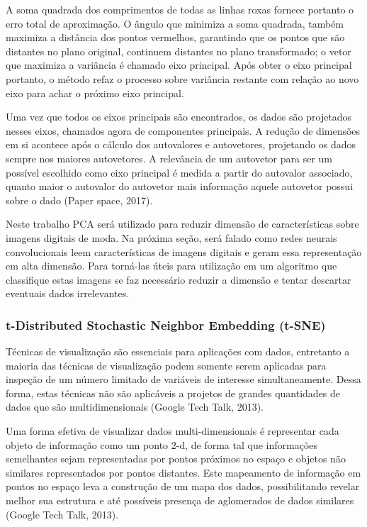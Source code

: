 \documentclass[12pt]{report}
\begin{document}
A soma quadrada dos comprimentos de todas as linhas roxas fornece portanto o erro total de aproximação. O ângulo que minimiza a soma quadrada, também maximiza a distância dos pontos vermelhos, garantindo que os pontos que são distantes no plano original, continuem distantes no plano transformado; o vetor que maximiza a variância é chamado eixo principal. Após obter o eixo principal portanto, o método refaz o processo sobre variância restante com relação ao novo eixo para achar o próximo eixo principal. 

Uma vez que todos os eixos principais são encontrados, os dados são projetados nesses eixos, chamados agora de componentes principais. A redução de dimensões em si acontece após o cálculo dos autovalores e autovetores, projetando os dados sempre nos maiores autovetores. A relevância de um autovetor para ser um possível escolhido como eixo principal é medida a partir do autovalor associado, quanto maior o autovalor do autovetor mais informação aquele autovetor possui sobre o dado (Paper space, 2017).

Neste trabalho PCA será utilizado para reduzir dimensão de características sobre imagens digitais de moda. Na próxima seção, será falado como redes neurais convolucionais leem características de imagens digitais e geram essa representação em alta dimensão. Para torná-las úteis para utilização em um algoritmo que classifique estas imagens se faz necessário reduzir a dimensão e tentar descartar eventuais dados irrelevantes. 

\subsubsection{t-Distributed Stochastic Neighbor Embedding (t-SNE)}

Técnicas de visualização são essenciais para aplicações com dados, entretanto a maioria das técnicas de visualização podem somente serem aplicadas para inspeção de um número limitado de variáveis de interesse simultaneamente. Dessa forma, estas técnicas não são aplicáveis a projetos de grandes quantidades de dados que são multidimensionais (Google Tech Talk, 2013).

Uma forma efetiva de visualizar dados multi-dimensionais é representar cada objeto de informação como um ponto 2-d, de forma tal que informações semelhantes sejam representadas por pontos próximos no espaço e objetos não similares representados por pontos distantes. Este mapeamento de informação em pontos no espaço leva a construção de um mapa dos dados, possibilitando revelar melhor sua estrutura e até possíveis presença de aglomerados de dados similares (Google Tech Talk, 2013). 
\end{document}
